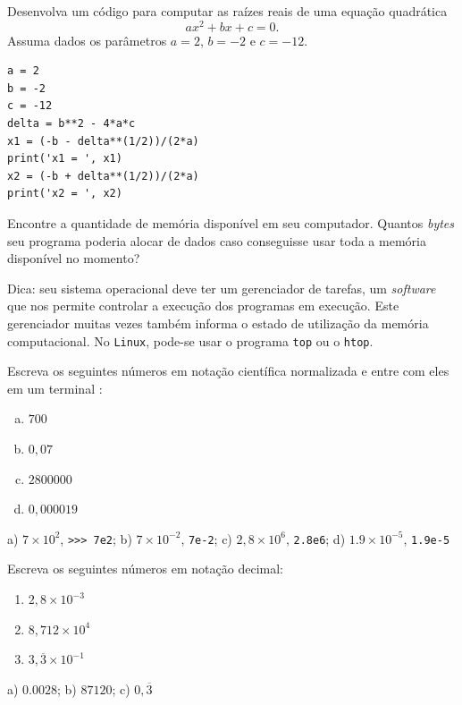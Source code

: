 \begin{exer}
  Desenvolva um código {\python} para computar as raízes reais de uma equação quadrática
  \begin{equation}
    ax^2 + bx + c = 0.
  \end{equation}
  Assuma dados os parâmetros $a=2$, $b=-2$ e $c=-12$.
\end{exer}
\begin{resp}

\begin{lstlisting}
a = 2
b = -2
c = -12
delta = b**2 - 4*a*c
x1 = (-b - delta**(1/2))/(2*a)
print('x1 = ', x1)
x2 = (-b + delta**(1/2))/(2*a)
print('x2 = ', x2)
\end{lstlisting}

\end{resp}

\begin{exer}
  Encontre a quantidade de memória disponível em seu computador. Quantos \textit{bytes} seu programa poderia alocar de dados caso conseguisse usar toda a memória disponível no momento?
\end{exer}
\begin{resp}
  Dica: seu sistema operacional deve ter um gerenciador de tarefas, um \textit{software} que nos permite controlar a execução dos programas em execução. Este gerenciador muitas vezes também informa o estado de utilização da memória computacional. No \lstinline+Linux+, pode-se usar o programa \lstinline+top+ ou o \lstinline+htop+.
\end{resp}

\begin{exer}
  Escreva os seguintes números em notação científica normalizada e entre com eles em um terminal {\python}:
  \begin{enumerate}[a)]
  \item $700$
  \item $0,07$
  \item $2800000$
  \item $0,000019$
  \end{enumerate}
\end{exer}
\begin{resp}
  a) $7\times 10^2$, \lstinline+>>> 7e2+; b) $7\times 10^{-2}$, \lstinline+7e-2+; c) $2,8\times 10^6$, \lstinline+2.8e6+; d) $1.9\times 10^{-5}$, \lstinline+1.9e-5+
\end{resp}

\begin{exer}
  Escreva os seguintes números em notação decimal:
  \begin{enumerate}
  \item $2,8\times 10^{-3}$
  \item $8,712\times 10^4$
  \item $3,\overline{3}\times 10^{-1}$
  \end{enumerate}
\end{exer}
\begin{resp}
  a) $0.0028$; b) $87120$; c) $0,\overline{3}$
\end{resp}

